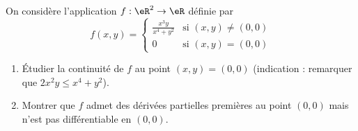 \begin{exercice}\label{exoCalculDifferentiel0004}

On considère l'application $f : \eR ^2 \to \eR $ définie par
\begin{equation}
	f(x,y) =
	\begin{cases}
		\frac{x^3y}{x^4+y^2} 	&	\text{si }(x,y)\neq(0,0)\\
		0			&	 \text{si }(x,y)=(0,0)
	\end{cases}
\end{equation}

\begin{enumerate}
	\item
 Étudier   la continuité de $f$ au point $(x,y)=(0,0)$ (indication : remarquer que $2x^2y \le x^4+y^2$).
 \item
 Montrer que $f$ admet des dérivées partielles premières au point $(0,0)$ mais n'est pas différentiable en $(0,0)$.
\end{enumerate}


\end{exercice}
